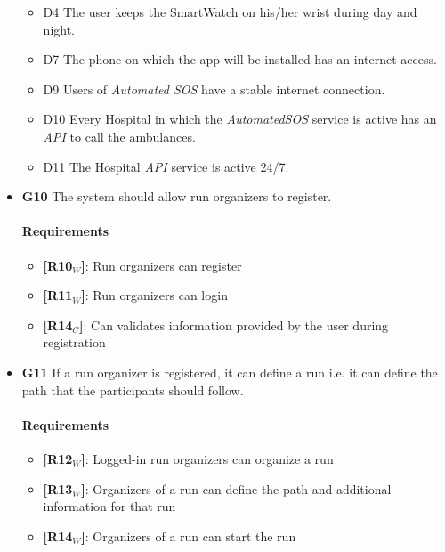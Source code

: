 \begin{itemize}
\begin{itemize}
     \item  D4  The user keeps the SmartWatch on his/her wrist during day and night.
    
     \item  D7  The phone on which the app will be installed has an internet access.
     
    \item  D9  Users of \textit{Automated SOS} have a stable internet connection.
    
    \item  D10  Every Hospital in which the \textit{AutomatedSOS} service is active has an \textit{API} to call the ambulances.
    
    \item  D11  The Hospital \textit{API} service is active 24/7.
   \end{itemize}
   
   
    \item \textbf{G10} The system should allow run organizers to register.
    \paragraph{Requirements}
   \begin{itemize}
    \item \textbf{[R10$_W$]}: Run organizers can register
    \item \textbf{[R11$_W$]}: Run organizers can login
    \item \textbf{[R14$_C$]}: Can validates information provided by the user during registration
   \end{itemize}
    
    
    \item \textbf{G11} If a run organizer is registered, it can define a run i.e. it can define the path that the participants should follow.
    \paragraph{Requirements}
   \begin{itemize}
    \item \textbf{[R12$_W$]}: Logged-in run organizers can organize a run
    \item \textbf{[R13$_W$]}: Organizers of a run can define the path and additional information for that run
    \item \textbf{[R14$_W$]}: Organizers of a run can start the run
   \end{itemize}
   

\end{itemize}
